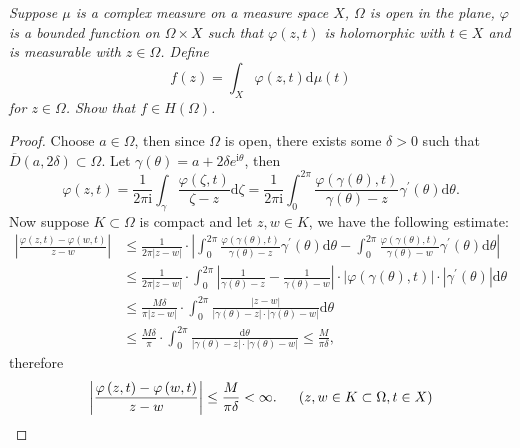 \begin{problem}\em
Suppose $\mu$ is a complex measure on a measure space $X$, $\Omega$ is open in the plane, $\varphi$ is a bounded function on $\Omega\times X$ such that $\varphi(z,t)$ is holomorphic with $t\in X$ and is measurable with $z\in\Omega$. Define 
$$f(z)=\int_X\varphi(z,t)\mathrm{d}\mu(t)$$
for $z\in\Omega$. Show that $f\in H(\Omega)$.\par
\end{problem}
\begin{proof}
Choose $a\in\Omega$, then since $\Omega$ is open, there exists some $\delta>0$ such that $\overline{D}(a,2\delta)\subset\Omega$. Let $\gamma(\theta)=a+2\delta e^{\mathrm{i}\theta}$, then 
$$
\varphi \left( z,t \right) =\frac{1}{2\pi \mathrm{i}}\int_{\gamma}{\frac{\varphi \left( \zeta ,t \right)}{\zeta -z}\mathrm{d}\zeta}=\frac{1}{2\pi \mathrm{i}}\int_0^{2\pi}{\frac{\varphi \left( \gamma \left( \theta \right) ,t \right)}{\gamma \left( \theta \right) -z}\gamma ^{\prime}\left( \theta \right) \mathrm{d}\theta}.
$$
Now suppose $K\subset\Omega$ is compact and let $z,w\in K$, we have the following estimate: 
$$
\begin{aligned}
\left| \frac{\varphi \left( z,t \right) -\varphi \left( w,t \right)}{z-w} \right|&\le \frac{1}{2\pi \left| z-w \right|}\cdot \left| \int_0^{2\pi}{\frac{\varphi \left( \gamma \left( \theta \right) ,t \right)}{\gamma \left( \theta \right) -z}\gamma ^{\prime}\left( \theta \right) \mathrm{d}\theta}-\int_0^{2\pi}{\frac{\varphi \left( \gamma \left( \theta \right) ,t \right)}{\gamma \left( \theta \right) -w}\gamma ^{\prime}\left( \theta \right) \mathrm{d}\theta} \right|
\\
&\le \frac{1}{2\pi \left| z-w \right|}\cdot \int_0^{2\pi}{\left| \frac{1}{\gamma \left( \theta \right) -z}-\frac{1}{\gamma \left( \theta \right) -w} \right|\cdot \left| \varphi \left( \gamma \left( \theta \right) ,t \right) \right|\cdot \left| \gamma ^{\prime}\left( \theta \right) \right|\mathrm{d}\theta}
\\
&\le \frac{M\delta}{\pi \left| z-w \right|}\cdot \int_0^{2\pi}{\frac{\left| z-w \right|}{\left| \gamma \left( \theta \right) -z \right|\cdot \left| \gamma \left( \theta \right) -w \right|}\mathrm{d}\theta}
\\
&\le \frac{M\delta}{\pi}\cdot \int_0^{2\pi}{\frac{\mathrm{d}\theta}{\left| \gamma \left( \theta \right) -z \right|\cdot \left| \gamma \left( \theta \right) -w \right|}}\le \frac{M}{\pi \delta},
\end{aligned}
$$
therefore 
$$
\left| \frac{\varphi \left( z,t \right) -\varphi \left( w,t \right)}{z-w} \right|\le \frac{M}{\pi \delta}<\infty .\hspace{0.5cm}\left( z,w\in K\subset \Omega ,t\in X \right) 
$$
\end{proof}
